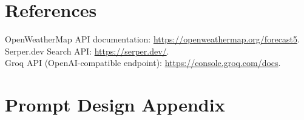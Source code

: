 \documentclass[10pt]{article}
\begin{document}
\section*{References}
OpenWeatherMap API documentation: \url{https://openweathermap.org/forecast5}.\\
Serper.dev Search API: \url{https://serper.dev/}.\\
Groq API (OpenAI-compatible endpoint): \url{https://console.groq.com/docs}.

\clearpage
\appendix
\section{Prompt Design Appendix}

\end{document}
